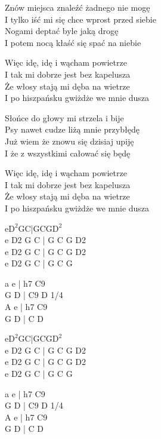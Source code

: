 \begin{textn}
    Znów miejsca znaleźć żadnego nie mogę\\
    I tylko iść mi się chce wprost przed siebie\\
    Nogami deptać byle jaką drogę\\
    I potem nocą kłaść się spać na niebie


     Więc idę, idę i wącham powietrze\\
    I tak mi dobrze jest bez kapelusza\\
    Że włosy stają mi dęba na wietrze\\
    I po hiszpańsku gwiżdże we mnie dusza


    Słońce do głowy mi strzela i bije\\
    Psy nawet cudze liżą mnie przybłędę\\
    Już wiem że znowu się dzisiaj upiję\\
    I że z wszystkimi całować się będę


    Więc idę, idę i wącham powietrze\\
    I tak mi dobrze jest bez kapelusza\\
    Że włosy stają mi dęba na wietrze\\
    I po hiszpańsku gwiżdże we mnie dusza
\end{textn}
\begin{chordw}
    e$\mathrm{D^{2}}$GC|GCG$\mathrm{D^{2}}$\\
    e D2 G C | G C G D2\\
    e D2 G C | G C G D2\\
    e D2 G C | G C G

    \hfill\break
    \hfill\break
    a e | h7 C9\\
    G D | C9 D 1/4\\
    A e | h7 C9\\
    G D | C D

    \hfill\break
    \hfill\break
    e$\mathrm{D^{2}}$GC|GCG$\mathrm{D^{2}}$\\
    e D2 G C | G C G D2\\
    e D2 G C | G C G D2\\
    e D2 G C | G C G

    \hfill\break
    \hfill\break
    a e | h7 C9\\
    G D | C9 D 1/4\\
    A e | h7 C9\\
    G D | C D
\end{chordw}
